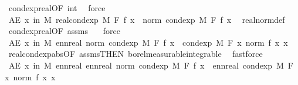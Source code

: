 \begin{isabellebody}
\ cond{\isacharunderscore}{\kern0pt}exp{\isacharunderscore}{\kern0pt}real{\isacharbrackleft}{\kern0pt}OF\ int{\isacharbrackright}{\kern0pt}\ \isamarkupfalse%
\ force\isanewline
\ \ \isamarkupfalse%
\ \isamarkupfalse%
\ {\isachardoublequoteopen}AE\ x\ in\ M{\isachardot}{\kern0pt}\ {\isasymbar}real{\isacharunderscore}{\kern0pt}cond{\isacharunderscore}{\kern0pt}exp\ M\ F\ f\ x{\isasymbar}\ {\isacharequal}{\kern0pt}\ norm\ {\isacharparenleft}{\kern0pt}cond{\isacharunderscore}{\kern0pt}exp\ M\ F\ f\ x{\isacharparenright}{\kern0pt}{\isachardoublequoteclose}\ \isamarkupfalse%
\ real{\isacharunderscore}{\kern0pt}norm{\isacharunderscore}{\kern0pt}def\ \isamarkupfalse%
\ cond{\isacharunderscore}{\kern0pt}exp{\isacharunderscore}{\kern0pt}real{\isacharbrackleft}{\kern0pt}OF\ assms{\isacharbrackright}{\kern0pt}\ {\isacharasterisk}{\kern0pt}\ \isamarkupfalse%
\ force\isanewline
\ \ \isamarkupfalse%
\ \isamarkupfalse%
\ {\isachardoublequoteopen}AE\ x\ in\ M{\isachardot}{\kern0pt}\ ennreal\ {\isacharparenleft}{\kern0pt}norm\ {\isacharparenleft}{\kern0pt}cond{\isacharunderscore}{\kern0pt}exp\ M\ F\ f\ x{\isacharparenright}{\kern0pt}{\isacharparenright}{\kern0pt}\ {\isasymle}\ cond{\isacharunderscore}{\kern0pt}exp\ M\ F\ {\isacharparenleft}{\kern0pt}{\isasymlambda}x{\isachardot}{\kern0pt}\ norm\ {\isacharparenleft}{\kern0pt}f\ x{\isacharparenright}{\kern0pt}{\isacharparenright}{\kern0pt}\ x{\isachardoublequoteclose}\ \isamarkupfalse%
\ real{\isacharunderscore}{\kern0pt}cond{\isacharunderscore}{\kern0pt}exp{\isacharunderscore}{\kern0pt}abs{\isacharbrackleft}{\kern0pt}OF\ assms{\isacharbrackleft}{\kern0pt}THEN\ borel{\isacharunderscore}{\kern0pt}measurable{\isacharunderscore}{\kern0pt}integrable{\isacharbrackright}{\kern0pt}{\isacharbrackright}{\kern0pt}\ \isamarkupfalse%
\ fastforce\isanewline
\ \ \isamarkupfalse%
\ {\isachardoublequoteopen}AE\ x\ in\ M{\isachardot}{\kern0pt}\ enn{}real\ {\isacharparenleft}{\kern0pt}ennreal\ {\isacharparenleft}{\kern0pt}norm\ {\isacharparenleft}{\kern0pt}cond{\isacharunderscore}{\kern0pt}exp\ M\ F\ f\ x{\isacharparenright}{\kern0pt}{\isacharparenright}{\kern0pt}{\isacharparenright}{\kern0pt}\ {\isasymle}\ enn{}real\ {\isacharparenleft}{\kern0pt}cond{\isacharunderscore}{\kern0pt}exp\ M\ F\ {\isacharparenleft}{\kern0pt}{\isasymlambda}x{\isachardot}{\kern0pt}\ norm\ {\isacharparenleft}{\kern0pt}f\ x{\isacharparenright}{\kern0pt}{\isacharparenright}{\kern0pt}\ x{\isacharparenright}{\kern0pt}{\isachardoublequoteclose}\ \isamarkupfalse%

\end{isabellebody}

